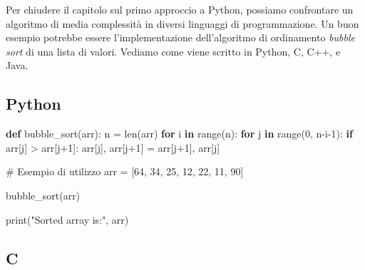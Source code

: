 \documentclass[
  letterpaper,
  DIV=11,
  numbers=noendperiod]{scrreprt}
\newenvironment{Shaded}{\begin{snugshade}}{\end{snugshade}}
\newcommand{\BuiltInTok}[1]{\textcolor[rgb]{0.00,0.23,0.31}{#1}}
\newcommand{\CommentTok}[1]{\textcolor[rgb]{0.37,0.37,0.37}{#1}}
\newcommand{\ControlFlowTok}[1]{\textcolor[rgb]{0.00,0.23,0.31}{\textbf{#1}}}
\newcommand{\DecValTok}[1]{\textcolor[rgb]{0.68,0.00,0.00}{#1}}
\newcommand{\KeywordTok}[1]{\textcolor[rgb]{0.00,0.23,0.31}{\textbf{#1}}}
\newcommand{\NormalTok}[1]{\textcolor[rgb]{0.00,0.23,0.31}{#1}}
\newcommand{\OperatorTok}[1]{\textcolor[rgb]{0.37,0.37,0.37}{#1}}
\newcommand{\StringTok}[1]{\textcolor[rgb]{0.13,0.47,0.30}{#1}}
\begin{document}
Per chiudere il capitolo sul primo approccio a Python, possiamo
confrontare un algoritmo di media complessità in diversi linguaggi di
programmazione. Un buon esempio potrebbe essere l'implementazione
dell'algoritmo di ordinamento \emph{bubble sort} di una lista di valori.
Vediamo come viene scritto in Python, C, C++, e Java.

\subsection{Python}\label{python}

\begin{Shaded}
\begin{Highlighting}[]
\KeywordTok{def}\NormalTok{ bubble\_sort(arr):}
\NormalTok{    n }\OperatorTok{=} \BuiltInTok{len}\NormalTok{(arr)}
    \ControlFlowTok{for}\NormalTok{ i }\KeywordTok{in} \BuiltInTok{range}\NormalTok{(n):}
        \ControlFlowTok{for}\NormalTok{ j }\KeywordTok{in} \BuiltInTok{range}\NormalTok{(}\DecValTok{0}\NormalTok{, n}\OperatorTok{{-}}\NormalTok{i}\OperatorTok{{-}}\DecValTok{1}\NormalTok{):}
            \ControlFlowTok{if}\NormalTok{ arr[j] }\OperatorTok{\textgreater{}}\NormalTok{ arr[j}\OperatorTok{+}\DecValTok{1}\NormalTok{]:}
\NormalTok{                arr[j], arr[j}\OperatorTok{+}\DecValTok{1}\NormalTok{] }\OperatorTok{=}\NormalTok{ arr[j}\OperatorTok{+}\DecValTok{1}\NormalTok{], arr[j]}

\CommentTok{\# Esempio di utilizzo}
\NormalTok{arr }\OperatorTok{=}\NormalTok{ [}\DecValTok{64}\NormalTok{, }\DecValTok{34}\NormalTok{, }\DecValTok{25}\NormalTok{, }\DecValTok{12}\NormalTok{, }\DecValTok{22}\NormalTok{, }\DecValTok{11}\NormalTok{, }\DecValTok{90}\NormalTok{]}

\NormalTok{bubble\_sort(arr)}

\BuiltInTok{print}\NormalTok{(}\StringTok{"Sorted array is:"}\NormalTok{, arr)}
\end{Highlighting}
\end{Shaded}

\subsection{C}\label{c}
\end{document}
